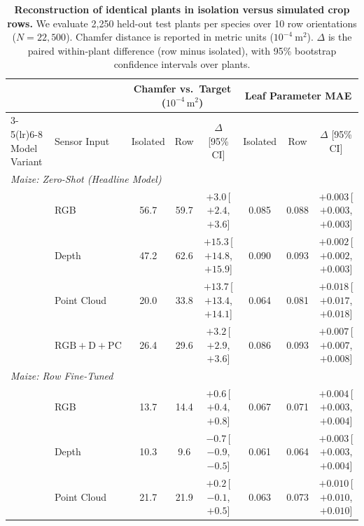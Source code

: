 \documentclass[10pt,twocolumn,letterpaper]{article}
\begin{document}
\begin{table}[t]
  \caption{\textbf{Reconstruction of identical plants in isolation versus simulated crop rows.} We evaluate 2{,}250 held-out test plants per species over 10 row orientations ($N = 22{,}500$). Chamfer distance is reported in metric units ($10^{-4}~\mathrm{m}^2$). $\Delta$ is the paired within-plant difference (row minus isolated), with 95\% bootstrap confidence intervals over plants.}
  \label{tab:rows}\label{tab:regime_3}
  \centering\scriptsize
  \setlength{\tabcolsep}{3.0pt}
  \begin{tabular}{l l ccc ccc}
    \toprule
    & & \multicolumn{3}{c}{Chamfer vs.\ Target ($10^{-4}\,\mathrm{m}^2$)} & \multicolumn{3}{c}{Leaf Parameter MAE} \\
    \cmidrule(lr){3-5}\cmidrule(lr){6-8}
    Model Variant & Sensor Input & Isolated & Row & $\Delta$ [95\% CI] & Isolated & Row & $\Delta$ [95\% CI] \\
    \midrule
    \multicolumn{8}{l}{\emph{Maize: Zero-Shot (Headline Model)}} \\
    & RGB & 56.7 & 59.7 & $+3.0$\,{\tiny[$+2.4$, $+3.6$]} & 0.085 & 0.088 & $+0.003$\,{\tiny[$+0.003$, $+0.003$]} \\
    & Depth & 47.2 & 62.6 & $+15.3$\,{\tiny[$+14.8$, $+15.9$]} & 0.090 & 0.093 & $+0.002$\,{\tiny[$+0.002$, $+0.003$]} \\
    & Point Cloud & 20.0 & 33.8 & $+13.7$\,{\tiny[$+13.4$, $+14.1$]} & 0.064 & 0.081 & $+0.018$\,{\tiny[$+0.017$, $+0.018$]} \\
    & $\mathrm{RGB}+\mathrm{D}+\mathrm{PC}$ & 26.4 & 29.6 & $+3.2$\,{\tiny[$+2.9$, $+3.6$]} & 0.086 & 0.093 & $+0.007$\,{\tiny[$+0.007$, $+0.008$]} \\
    \midrule
    \multicolumn{8}{l}{\emph{Maize: Row Fine-Tuned}} \\
    & RGB & 13.7 & 14.4 & $+0.6$\,{\tiny[$+0.4$, $+0.8$]} & 0.067 & 0.071 & $+0.004$\,{\tiny[$+0.003$, $+0.004$]} \\
    & Depth & 10.3 & 9.6 & $-0.7$\,{\tiny[$-0.9$, $-0.5$]} & 0.061 & 0.064 & $+0.003$\,{\tiny[$+0.003$, $+0.004$]} \\
    & Point Cloud & 21.7 & 21.9 & $+0.2$\,{\tiny[$-0.1$, $+0.5$]} & 0.063 & 0.073 & $+0.010$\,{\tiny[$+0.010$, $+0.010$]} \\

\end{tabular}
\end{table}
\end{document}
